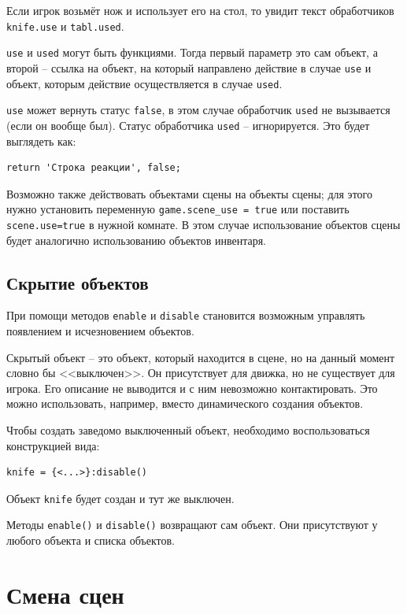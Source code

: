 \documentclass[a4paper,12pt]{article}
\begin{document}
Если игрок возьмёт нож и использует его на стол, то увидит текст обработчиков \verb/knife.use/ и \verb/tabl.used/.

\verb/use/ и \verb/used/ могут быть функциями. Тогда первый параметр это сам объект, а второй -- ссылка на объект, на который направлено действие в случае \verb/use/ и объект, которым действие осуществляется в случае \verb/used/.

\verb/use/ может вернуть статус \verb/false/, в этом случае обработчик \verb/used/ не вызывается (если он вообще был). Статус обработчика \verb/used/ -- игнорируется. Это будет выглядеть как:

\begin{verbatim}
return 'Строка реакции', false;
\end{verbatim}

Возможно также действовать объектами сцены на объекты сцены; для этого нужно установить переменную \verb/game.scene_use = true/ или поставить \verb/scene.use=true/ в нужной комнате. В этом случае использование объектов сцены будет аналогично использованию объектов инвентаря.

\subsection{Скрытие объектов}


При помощи методов \verb/enable/ и \verb/disable/ становится возможным управлять появлением и исчезновением объектов.

Скрытый объект -- это объект, который находится в сцене, но на данный момент словно бы <<выключен>>. Он присутствует для движка, но не существует для игрока. Его описание не выводится и с ним невозможно контактировать. Это можно использовать, например, вместо динамического создания объектов.

Чтобы создать заведомо выключенный объект, необходимо воспользоваться конструкцией вида:

\begin{verbatim}
knife = {<...>}:disable()
\end{verbatim}

Объект \verb/knife/ будет создан и тут же выключен.

Методы \verb/enable()/ и \verb/disable()/ возвращают сам объект. Они присутствуют у любого объекта и списка объектов.

\section{Смена сцен}
\end{document}
